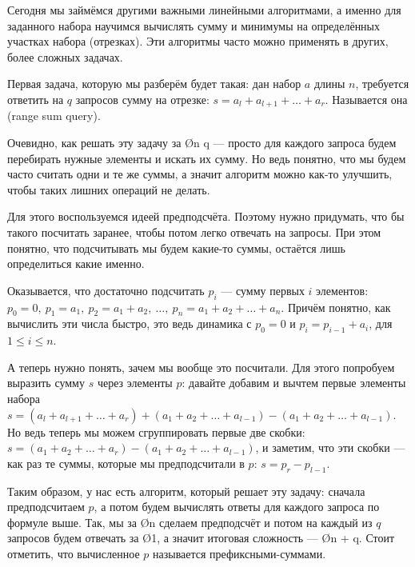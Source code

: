 Сегодня мы займёмся другими важными линейными алгоритмами, а именно для заданного набора научимся вычислять сумму и минимумы на определённых участках набора (отрезках). Эти алгоритмы часто можно применять в других, более сложных задачах.


Первая задача, которую мы разберём будет такая: дан набор $a$ длины $n$, требуется ответить на $q$ запросов сумму на отрезке: $s = a_l + a_{l + 1} + \ldots + a_r$. Называется она  (range sum query).

Очевидно, как решать эту задачу за \O{n \cdot q} — просто для каждого запроса будем перебирать нужные элементы и искать их сумму. Но ведь понятно, что мы будем часто считать одни и те же суммы, а значит алгоритм можно как-то улучшить, чтобы таких лишних операций не делать.

Для этого воспользуемся идеей предподсчёта. Поэтому нужно придумать, что бы такого посчитать заранее, чтобы потом легко отвечать на запросы. При этом понятно, что подсчитывать мы будем какие-то суммы, остаётся лишь определиться какие именно.

\begin{wrapping}{0.35}
    Оказывается, что достаточно подсчитать $p_i$ — сумму первых $i$ элементов: $p_0 = 0,\ p_1 = a_1,\ p_2 = a_1 + a_2,\ \ldots,\ p_n = a_1 + a_2 + \ldots + a_n$. Причём понятно, как вычислить эти числа быстро, это ведь динамика с $p_0 = 0$ и $p_i = p_{i - 1} + a_i$, для $1 \leq i \leq n$.
    
    А теперь нужно понять, зачем мы вообще это посчитали. Для этого попробуем выразить сумму $s$ через элементы $p$: давайте добавим и вычтем первые элементы набора $s = (a_l + a_{l + 1} + \ldots + a_{r}) + (a_1 + a_2 + \ldots + a_{l - 1}) - (a_1 + a_2 + \ldots + a_{l - 1})$. Но ведь теперь мы можем сгруппировать первые две скобки: $s = (a_1 + a_2 + \ldots + a_r) - (a_1 + a_2 + \ldots + a_{l - 1})$, и заметим, что эти скобки — как раз те суммы, которые мы предподсчитали в $p$: $s = p_r - p_{l - 1}$.
\end{wrapping}

Таким образом, у нас есть алгоритм, который решает эту задачу: сначала предподсчитаем $p$, а потом будем вычислять ответы для каждого запроса по формуле выше. Так, мы за \O{n} сделаем предподсчёт и потом на каждый из $q$ запросов будем отвечать за \O{1}, а значит итоговая сложность — \O{n + q}. Стоит отметить, что вычисленное $p$ называется префиксными-суммами.




